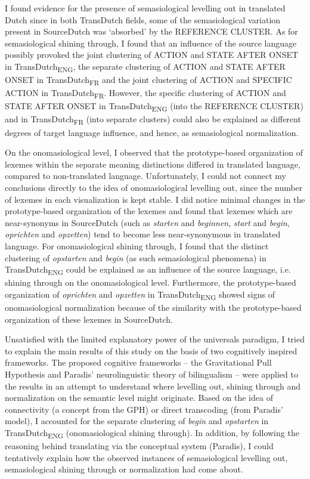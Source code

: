 I found evidence for the presence of semasiological levelling out in translated Dutch since in both TransDutch fields, some of the semasiological variation present in SourceDutch was ‘absorbed’ by the REFERENCE CLUSTER. As for semasiological shining through, I found that an influence of the source language possibly provoked the joint clustering of ACTION and STATE AFTER ONSET in TransDutch\textsubscript{ENG}, the separate clustering of ACTION and STATE AFTER ONSET in TransDutch\textsubscript{FR} and the joint clustering of ACTION and {SPECIFIC} ACTION in TransDutch\textsubscript{FR}. However, the specific clustering of ACTION and STATE AFTER ONSET in TransDutch\textsubscript{ENG} (into the REFERENCE CLUSTER) and in TransDutch\textsubscript{FR} (into separate clusters) could also be explained as different degrees of target language influence, and hence, as semasiological normalization.



On the onomasiological level, I observed that the prototype-based organization of lexemes within the separate meaning distinctions differed in translated language, compared to non-translated language. Unfortunately, I could not connect my conclusions directly to the idea of onomasiological levelling out, since the number of lexemes in each visualization is kept stable. I did notice minimal changes in the prototype-based organization of the lexemes and found that lexemes which are near-synonyms in SourceDutch (such as \textit{starten} and \textit{beginnen}, \textit{start} and \textit{begin}, \textit{oprichten} and \textit{opzetten}) tend to become less near-synonymous in translated language. For onomasiological shining through, I found that the distinct clustering of \textit{opstarten} and \textit{begin} (as such semasiological phenomena) in TransDutch\textsubscript{ENG} could be explained as an influence of the source language, i.e. shining through on the onomasiological level. Furthermore, the prototype-based organization of \textit{oprichten} and \textit{opzetten} in TransDutch\textsubscript{ENG} showed signs of onomasiological normalization because of the similarity with the prototype-based organization of these lexemes in SourceDutch.



Unsatisfied with the limited explanatory power of the universals paradigm, I tried to explain the main results of this study on the basis of two cognitively inspired frameworks. The proposed cognitive frameworks – the Gravitational Pull Hypothesis and Paradis’ neurolinguistic theory of bilingualism – were applied to the results in an attempt to understand where levelling out, shining through and normalization on the semantic level might originate. Based on the idea of connectivity (a concept from the GPH) or direct transcoding (from Paradis’ model), I accounted for the separate clustering of \textit{begin} and \textit{opstarten} in TransDutch\textsubscript{ENG} (onomasiological shining through). In addition, by following the reasoning behind translating via the conceptual system (Paradis), I could tentatively explain how the observed instances of semasiological levelling out, semasiological shining through or normalization had come about.


